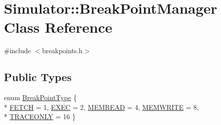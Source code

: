 \hypertarget{class_simulator_1_1_break_point_manager}{\section{Simulator\+:\+:Break\+Point\+Manager Class Reference}
\label{class_simulator_1_1_break_point_manager}
}


{\ttfamily \#include $<$breakpoints.\+h$>$}

\subsection*{Public Types}
\begin{DoxyCompactItemize}
\item 
enum \hyperlink{class_simulator_1_1_break_point_manager_a425072fcb3c0e59e3fb6f300d6afbd7b}{Break\+Point\+Type} \{ \\*
\hyperlink{class_simulator_1_1_break_point_manager_a425072fcb3c0e59e3fb6f300d6afbd7baccb2fb913155b4416bf8f54adbc79c97}{F\+E\+T\+C\+H} = 1, 
\hyperlink{class_simulator_1_1_break_point_manager_a425072fcb3c0e59e3fb6f300d6afbd7ba22cfe04247cd5846d978d8ad19755ec4}{E\+X\+E\+C} = 2, 
\hyperlink{class_simulator_1_1_break_point_manager_a425072fcb3c0e59e3fb6f300d6afbd7ba7c5132b18f18695faa853ee1bd089b19}{M\+E\+M\+R\+E\+A\+D} = 4, 
\hyperlink{class_simulator_1_1_break_point_manager_a425072fcb3c0e59e3fb6f300d6afbd7baed5743529528d4fef1fe3202e9ad7aeb}{M\+E\+M\+W\+R\+I\+T\+E} = 8, 
\\*
\hyperlink{class_simulator_1_1_break_point_manager_a425072fcb3c0e59e3fb6f300d6afbd7ba55258c41764b4331fd275e45b178e464}{T\+R\+A\+C\+E\+O\+N\+L\+Y} = 16
 \}
\end{DoxyCompactItemize}
